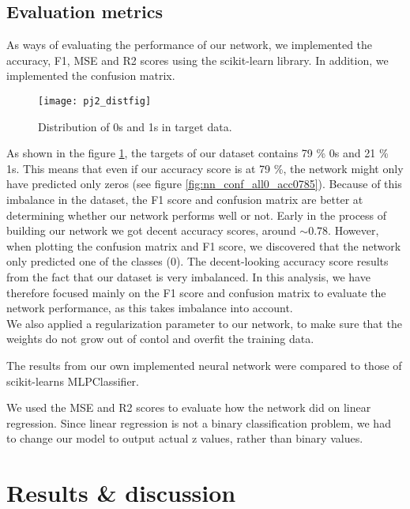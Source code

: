 \documentclass[11pt,english, A4]{article}
\begin{document}
\subsection{Evaluation metrics}

As ways of evaluating the performance of our network, we implemented the accuracy, F1, MSE and R2 scores using the scikit-learn library. In addition, we implemented the confusion matrix.

\begin{figure}[H]
  \begin{center}
  \texttt{[image: pj2\_distfig]}
  \caption{Distribution of 0s and 1s in target data.}
  \label{fig:pj2_distfig}
  \end{center}
\end{figure}


As shown in the figure \ref{fig:pj2_distfig}, the targets of our dataset contains 79 \% 0s and 21 \% 1s. This means that even if our accuracy score is at 79 \%, the network might only have predicted only zeros (see figure \ref{fig:nn_conf_all0_acc0785}). Because of this imbalance in the dataset, the F1 score and confusion matrix are better at determining whether our network performs well or not. Early in the process of building our network we got decent accuracy scores, around $\sim 0.78$. However, when plotting the confusion matrix and F1 score, we discovered that the network only predicted one of the classes (0). The decent-looking accuracy score results from the fact that our dataset is very imbalanced. In this analysis, we have therefore focused mainly on the F1 score and confusion matrix to evaluate the network performance, as this takes imbalance into account. \\


We also applied a regularization parameter to our network, to make sure that the weights do not grow out of contol and overfit the training data.

The results from our own implemented neural network were compared to those of scikit-learns MLPClassifier.

We used the MSE and R2 scores to evaluate how the network did on linear regression. Since linear regression is not a binary classification problem, we had to change our model to output actual z values, rather than binary values. 



\newpage
\section{Results \& discussion}
\end{document}
